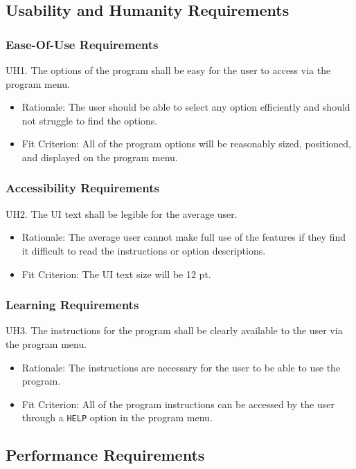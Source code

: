 \documentclass[12pt, titlepage]{article}
\begin{document}
\subsection{Usability and Humanity Requirements}
\subsubsection{Ease-Of-Use Requirements}
UH1. The options of the program shall be easy for the user to access via the program menu.
\begin{itemize}
    \item Rationale: The user should be able to select any option efficiently and should not struggle to find the options.
    \item \color{red} Fit Criterion: All of the program options will be reasonably sized, positioned, and displayed on the program menu. \color{black}
\end{itemize}
\subsubsection{Accessibility Requirements}
UH2. The UI text shall be legible for the average user.
\begin{itemize}
    \item Rationale: The average user cannot make full use of the features if they find it difficult to read the instructions or option descriptions.
    \item \color{red} Fit Criterion: The UI text size will be 12 pt. \color{black}
\end{itemize}
\subsubsection{Learning Requirements}
UH3. The instructions for the program shall be clearly available to the user via the program menu.
\begin{itemize}
    \item Rationale: The instructions are necessary for the user to be able to use the program.
    \item \color{red} Fit Criterion: All of the program instructions can be accessed by the user through a \texttt{HELP} option in the program menu. \color{black}
\end{itemize}
\subsection{Performance Requirements}
\end{document}
